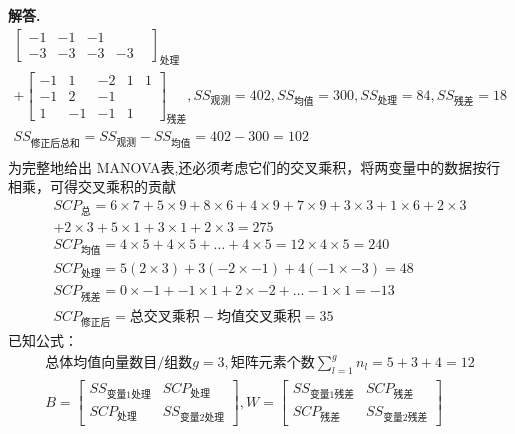 \documentclass[12pt, a4paper, oneside]{ctexart}
\newenvironment{solution}{\par\noindent\textbf{解答. }}{\par}
\begin{document}
\begin{solution}
\[\begin{gathered}
\begin{bmatrix}
            -1 & -1 & -1 &  &  \\
            -3 & -3 & -3 & -3 &  
        \end{bmatrix}_{\text{处理}}\\
        +
        \begin{bmatrix}
            -1 & 1 & -2 & 1 & 1 \\
            -1 & 2 & -1 &  &  \\
            1 & -1 & -1 & 1 &
        \end{bmatrix}_{\text{残差}},
        {SS}_{\text{观测}}=402, {SS}_{\text{均值}}=300, {SS}_{\text{处理}}=84, {SS}_{\text{残差}}=18\\
        {SS}_\text{修正后总和}={SS}_{\text{观测}}-{SS}_{\text{均值}}=402-300=102\\
    \end{gathered}
    \]
为完整地给出 MANOVA表,还必须考虑它们的交叉乘积，将两变量中的数据按行相乘，可得交叉乘积的贡献
\[
\begin{gathered}
    {SCP}_\text{总}=6 \times 7 + 5 \times 9 + 8 \times 6 + 4 \times 9 + 7 \times 9 + 3 \times 3 + 1 \times 6 + 2 \times 3\\
    + 2 \times 3 + 5 \times 1 + 3 \times 1 + 2 \times 3 = 275\\
    {SCP}_\text{均值}=4 \times 5 + 4 \times 5 + \hdots + 4 \times 5  = 12 \times 4 \times 5=240\\
    {SCP}_\text{处理}=5(2 \times 3) + 3(-2 \times -1) + 4(-1 \times -3) = 48\\
    {SCP}_\text{残差}=0 \times -1 + -1 \times 1 + 2 \times -2 + \hdots -1\times 1=-13\\
    {SCP}_\text{修正后}=\text{总交叉乘积}-\text{均值交叉乘积}=35
\end{gathered}
\]
已知公式：
\[
    \begin{gathered}
    \text{总体均值向量数目/组数}g=3, \text{矩阵元素个数}\sum_{l=1}^{g}n_l =5+3+4=12\\
    B=\begin{bmatrix} {SS}_{\text{变量1处理}} & {SCP}_\text{处理} \\ {SCP}_\text{处理} & {SS}_{\text{变量2处理}} \end{bmatrix},
    W=\begin{bmatrix} {SS}_{\text{变量1残差}} & {SCP}_\text{残差} \\ {SCP}_\text{残差} & {SS}_{\text{变量2残差}} \end{bmatrix}
    \end{gathered}
\]


\end{solution}
\end{document}

